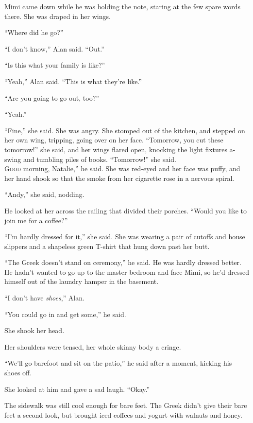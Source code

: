 Mimi came down while he was holding the note, staring at the few spare
words there.  She was draped in her wings.

``Where did he go?''

``I don't know,'' Alan said.  ``Out.''

``Is this what your family is like?''

``Yeah,'' Alan said.  ``This is what they're like.''

``Are you going to go out, too?''

``Yeah.''

``Fine,'' she said.  She was angry.  She stomped out of the kitchen,
and stepped on her own wing, tripping, going over on her face. 
``Tomorrow, you cut these tomorrow!'' she said, and her wings flared
open, knocking the light fixtures a-swing and tumbling piles of books. 
``Tomorrow!'' she said. 
\\
\lettrine[lines=3, lhang=.5, nindent=0pt, findent=2pt]{G}{ood}
morning, Natalie,'' he said.  She was red-eyed and her face was
puffy, and her hand shook so that the smoke from her cigarette rose in
a nervous spiral.

``Andy,'' she said, nodding. 

He looked at her across the railing that divided their porches. 
``Would you like to join me for a coffee?''

``I'm hardly dressed for it,'' she said.  She was wearing a pair of
cutoffs and house slippers and a shapeless green T-shirt that hung
down past her butt. 

``The Greek doesn't stand on ceremony,'' he said.  He was hardly
dressed better.  He hadn't wanted to go up to the master bedroom and
face Mimi, so he'd dressed himself out of the laundry hamper in the
basement. 

``I don't have \textit{shoes},'' Alan.

``You could go in and get some,'' he said.

She shook her head. 

Her shoulders were tensed, her whole skinny body a cringe.

``We'll go barefoot and sit on the patio,'' he said after a moment,
kicking his shoes off.

She looked at him and gave a sad laugh.  ``Okay.''

The sidewalk was still cool enough for bare feet.  The Greek didn't
give their bare feet a second look, but brought iced coffees and
yogurt with walnuts and honey. 


